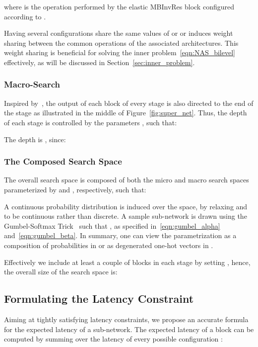 \documentclass[dvipsnames,table,xcdraw]{article}
\begin{document}
where  is the operation performed by the elastic MBInvRes block configured according to .

Having several configurations  share the same values of  or  or  induces weight sharing between the common operations of the associated architectures. This weight sharing is beneficial for solving the inner problem~\eqref{eqn:NAS_bilevel} effectively, as will be discussed in Section~\ref{sec:inner_problem}.


\subsubsection{Macro-Search}\label{sec:macro_search}
Inspired by~\cite{TF-NAS, OFA}, the output of each block of every stage is also directed to the end of the stage as illustrated in the middle of Figure~\ref{fig:super_net}. Thus, the depth of each stage  is controlled by the parameters , such that:

The depth is , since:


\subsubsection{The Composed Search Space}\label{sec:composed_search_space}
The overall search space is composed of both the micro and macro search spaces parameterized by  and , respectively, such that:


A continuous probability distribution is induced over the space, by relaxing  and  to be continuous rather than discrete.
A sample sub-network is drawn  using the Gumbel-Softmax Trick~\cite{GumbelSM} such that , as specified in~\eqref{eqn:gumbel_alpha} and~\eqref{eqn:gumbel_beta}.
In summary, one can view the parametrization  as a composition of probabilities in  or as degenerated one-hot vectors in .

Effectively we include at least a couple of blocks in each stage by setting , hence, the overall size of the search space is:



\subsection{Formulating the Latency Constraint}
\label{sec:latency_formula}
Aiming at tightly satisfying latency constraints, we propose an accurate formula for the expected latency of a sub-network. The expected latency of a block  can be computed by summing over the latency  of every possible configuration :
\end{document}

